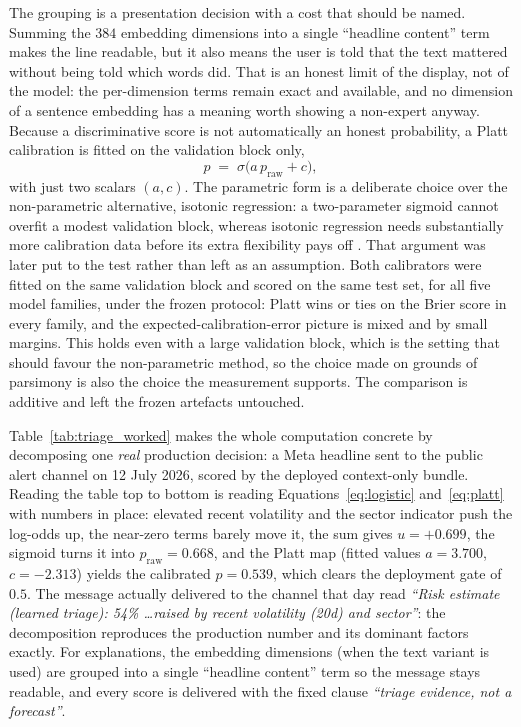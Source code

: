 The grouping is a presentation decision with a cost that should be named. Summing the $384$ embedding
dimensions into a single ``headline content'' term makes the line readable, but it also means the user
is told that the text mattered without being told which words did. That is an honest limit of the
display, not of the model: the per-dimension terms remain exact and available, and no dimension of a
sentence embedding has a meaning worth showing a non-expert anyway. Because a discriminative score is not automatically an honest probability, a Platt
calibration is fitted on the validation block only,
\begin{equation}
p \;=\; \sigma\!\big(a\,p_{\text{raw}} + c\big),
\label{eq:platt}
\end{equation}
with just two scalars $(a, c)$. The parametric form is a deliberate choice over the non-parametric
alternative, isotonic regression: a two-parameter sigmoid cannot overfit a modest validation block,
whereas isotonic regression needs substantially more calibration data before its extra flexibility pays
off \autocite{niculescu2005calibration}. That argument was later put to the test rather than left as an
assumption. Both calibrators were fitted on the same validation block and scored on the same test set,
for all five model families, under the frozen protocol: Platt wins or ties on the Brier score in every
family, and the expected-calibration-error picture is mixed and by small margins. This holds even with
a large validation block, which is the setting that should favour the non-parametric method, so the
choice made on grounds of parsimony is also the choice the measurement supports. The comparison is
additive and left the frozen artefacts untouched.

Table~\ref{tab:triage_worked} makes the whole computation concrete by decomposing one \emph{real}
production decision: a Meta headline sent to the public alert channel on 12 July 2026, scored by the
deployed context-only bundle. Reading the table top to bottom is reading
Equations~\eqref{eq:logistic} and~\eqref{eq:platt} with numbers in place: elevated recent volatility and
the sector indicator push the log-odds up, the near-zero terms barely move it, the sum gives
$u = +0.699$, the sigmoid turns it into $p_{\text{raw}} = 0.668$, and the Platt map (fitted values
$a = 3.700$, $c = -2.313$) yields the calibrated $p = 0.539$, which clears the deployment gate of
$0.5$. The message actually delivered to the channel that day read \emph{``Risk estimate (learned
triage): 54\% \dots raised by recent volatility (20d) and sector''}: the decomposition reproduces the
production number and its dominant factors exactly. For explanations,
the embedding dimensions (when the text variant is used) are grouped into a single ``headline content''
term so the message stays readable, and every score is delivered with the fixed clause \emph{``triage
evidence, not a forecast''}.

